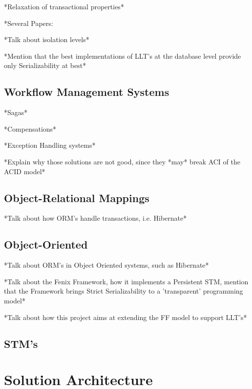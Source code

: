 \documentclass{llncs}
\begin{document}
*Relaxation of transactional properties*

*Several Papers: \cite{hagmann1991implementing} \cite{garcia1987sagas}
\cite{salem1989altruistic}

*Talk about isolation levels*

*Mention that the best implementations of LLT's at the database level
provide only Serializability at best*

\subsection{Workflow Management Systems}

*Sagas* \cite{garcia1987sagas}

\cite{798492}

*Compensations*

*Exception Handling systems*

*Explain why those solutions are not good, since they *may* break ACI
of the ACID model*

\subsection{Object-Relational Mappings}

*Talk about how ORM's handle transactions, i.e. Hibernate*

\subsection{Object-Oriented}

*Talk about ORM's in Object Oriented systems, such as Hibernate*

*Talk about the Fenix Framework, how it implements a Persistent STM,
mention that the Framework brings Strict Serializability to a
'transparent' programming model* \cite{fernandes2011strict} 
\cite{guerraoui2008correctness} \cite{cachopo2006versioned}

*Talk about how this project aims at extending the FF model to support LLT's*

\subsection{STM's}
\label{sec:stm}


\section{Solution Architecture}
\end{document}
